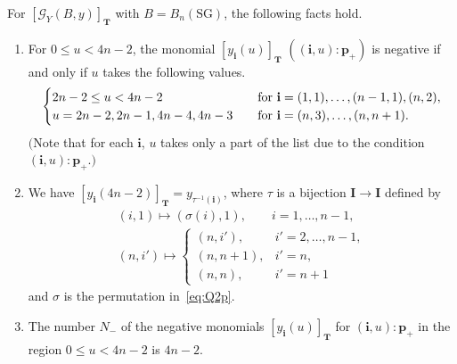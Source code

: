 \begin{Proposition}
\label{prop:lev2}
 For
$[\mathcal{G}_Y(B,y)]_{\mathbf{T}}$
with $B=B_{n}(\mathrm{SG})$, the following facts hold.

\begin{enumerate}\itemsep=0pt
\item[$(i)$]  For $0 \le u < 4n-2$,
the  monomial $[y_{\mathbf{i}}(u)]_{\mathbf{T}}$
$((\mathbf{i},u):\mathbf{p}_+)$
is negative if and only if $u$ takes the following values.
\[
\begin{cases}
2n-2 \leq u < 4n-2 &
\quad\mbox{\rm for $\mathbf{i}=(1,1),\dots,(n-1,1),(n,2)$},\\
u=2n-2,2n-1, 4n-4, 4n-3 &
\quad\mbox{\rm for $\mathbf{i}=(n,3),\dots,(n,n+1)$}.
\end{cases}
\]
$($Note that for each $\mathbf{i}$, $u$ takes only a part
of the list due to the condition $(\mathbf{i},u):\mathbf{p}_+.)$
\item[$(ii)$]
 We have $[y_{\mathbf{i}}(4n-2)]_{\mathbf{T}}
=y_{\tau^{-1}(\mathbf{i})}$,
where $\tau$ is a bijection $\mathbf{I} \rightarrow
\mathbf{I}$ defined by
\begin{gather*}
(i,1)   \mapsto (\sigma(i),1),
\qquad i=1,\dots,n-1,\\
(n,i')   \mapsto
\begin{cases}
(n,i'),& i'=2,\dots,n-1,\\
(n,n+1),& i'=n,\\
(n,n),& i'=n+1
\end{cases}
\end{gather*}
and $\sigma$ is the permutation in~\eqref{eq:Q2p}.

\item[$(iii)$] The number $N_-$ of the negative monomials
$[y_{\mathbf{i}}(u)]_{\mathbf{T}}$ for $(\mathbf{i},u):\mathbf{p}_+$
in the region $0\leq u < 4n-2$ is $4n-2$.
\end{enumerate}
\end{Proposition}



